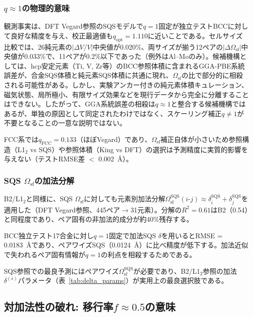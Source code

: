 \documentclass[5p,10pt]{elsarticle}
\begin{document}
\subsubsection{$q \approx 1$の物理的意味}

観測事実は、DFT Vegard参照のSQSモデルで$q=1$固定が独立テストBCCに対して良好な精度を与え、校正最適値も$q_\text{opt}=1.110$に近いことである。セルサイズ比較では、26純元素の$\left|\Delta V/V\right|$中央値が0.020\%、両サイズが揃う12ペアの$\left|\Delta\Omega_\text{sf}\right|$中央値が0.033\%で、11ペアが0.2\%以下であった（例外はAl--Moのみ）。候補機構としては、hcp安定元素（Ti, V, Zr等）のBCC参照体積に含まれるGGA-PBE系統誤差が、合金SQS体積と純元素SQS体積に共通に現れ、$\Omega_\text{sf}$の比で部分的に相殺される可能性がある。しかし、実験アンカー付きの純元素体積キュレーション、磁気状態、局所極小、有限サイズ効果などを現行データから完全に分離することはできない。したがって、GGA系統誤差の相殺は$q\approx1$と整合する候補機構ではあるが、単独の原因として同定されたわけではなく、スケーリング補正$q\neq1$が不要となることの一意な説明ではない。

FCC系では$q_\text{FCC} = 0.133$（ほぼVegard）であり、$\Omega_\text{sf}$補正自体が小さいため参照構造（L1$_2$ vs SQS）や参照体積（King vs DFT）の選択は予測精度に実質的影響を与えない（テストRMSE差 $<$ 0.002~\AA{}）。

\subsubsection{SQS $\Omega_\text{sf}$の加法分解}

B2/L1$_2$と同様に、SQS $\Omega_\text{sf}$に対しても元素別加法分解$\Omega_\text{sf}^\text{SQS}(i\text{-}j) \approx \delta_i^\text{SQS} + \delta_j^\text{SQS}$を適用した（DFT Vegard参照、445ペア$\to$31元素）。分解の$R^2 = 0.61$はB2（0.54）と同程度であり、ペア固有の非加法的成分が約40\%残存する。

BCC独立テスト17合金に対し$q = 1$固定で加法SQS $\delta$を用いるとRMSE = 0.0183~\AA{}であり、ペアワイズSQS（0.0124~\AA）に比べ精度が低下する。加法近似で失われるペア固有情報が$q = 1$の利点を相殺するためである。

SQS参照での最良予測にはペアワイズ$\Omega_\text{sf}^\text{SQS}$が必要であり、B2/L1$_2$参照の加法$\delta^{(s)}$パラメータ（表~\ref{tab:delta_params}）が実用上の最良選択肢である。


\subsection{対加法性の破れ: 移行率$f \approx 0.5$の意味}
\label{sec:disc_transfer}
\end{document}
